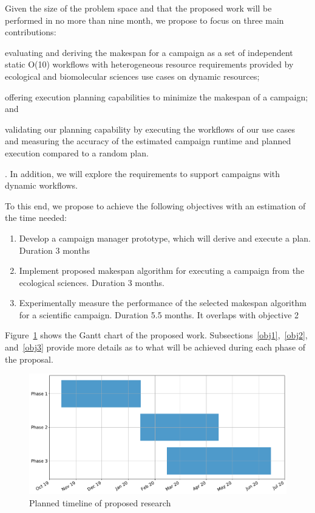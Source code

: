 \label{timeline}
Given the size of the problem space and that the proposed work will be performed in no more than nine month, we propose to focus on three main contributions:
\begin{inparaenum}[(1)]
\item evaluating and deriving the makespan for a campaign as a set of independent static O(10) workflows with heterogeneous resource requirements provided by ecological and biomolecular sciences use cases on dynamic resources; 
\item offering execution planning capabilities to minimize the makespan of a campaign; and 
\item validating our planning capability by executing the workflows of our use cases and measuring the accuracy of the estimated campaign runtime and planned execution compared to a random plan.
\end{inparaenum}.
In addition, we will explore the requirements to support campaigns with dynamic workflows.

To this end, we propose to achieve the following objectives with an estimation of the time needed:
\begin{enumerate}
    \item Develop a campaign manager prototype, which will derive and execute a plan. Duration 3 months
    \item Implement proposed makespan algorithm for executing a campaign from the ecological sciences. Duration 3 months.
    \item Experimentally measure the performance of the selected makespan algorithm for a scientific campaign. Duration 5.5 months. It overlaps with objective 2 
\end{enumerate}
Figure~\ref{fig:work_plan} shows the Gantt chart of the proposed work.
Subsections~\ref{obj1},~\ref{obj2}, and~\ref{obj3} provide more details as to what will be achieved during each phase of the proposal.

\begin{figure}[t]
	\centering
	\includegraphics[width=.95\textwidth]{figures/phd_plan.pdf}
	\caption{Planned timeline of proposed research}\label{fig:work_plan}
\end{figure}

